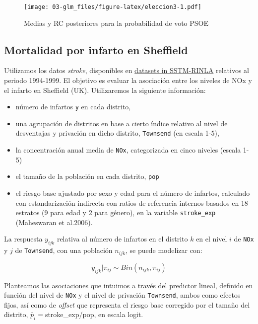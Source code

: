 \documentclass[
]{book}
\providecommand{\tightlist}{%
  \setlength{\itemsep}{0pt}\setlength{\parskip}{0pt}}
\begin{document}
\begin{figure}
\centering
\texttt{[image: 03-glm\_files/figure-latex/eleccion3-1.pdf]}
\caption{\label{fig:eleccion3}Medias y RC posteriores para la probabilidad de voto PSOE}
\end{figure}

\hypertarget{mortalidad-por-infarto-en-sheffield}{%
\subsection{Mortalidad por infarto en Sheffield}\label{mortalidad-por-infarto-en-sheffield}}

Utilizamos los datos \emph{stroke}, disponibles en \href{https://sites.google.com/a/r-inla.org/stbook/datasets}{datasets in
SSTM-RINLA} relativos al periodo 1994-1999. El objetivo es evaluar la asociación entre los niveles de
NOx y el infarto en Sheffield (UK). Utilizaremos la siguiente información:

\begin{itemize}
\tightlist
\item
  número de infartos \texttt{y} en cada distrito,
\item
  una agrupación de distritos en base a cierto índice relativo al nivel de desventajas y privación en dicho distrito, \texttt{Townsend} (en escala 1-5),
\item
  la concentración anual media de \texttt{NOx}, categorizada en cinco niveles (escala 1-5)
\item
  el tamaño de la población en cada distrito, \texttt{pop}
\item
  el riesgo base ajustado por sexo y edad para el número de infartos, calculado con estandarización indirecta con ratios de referencia internos basados en 18 estratos (9 para edad y 2 para género), en la variable \texttt{stroke\_exp} (Maheswaran et al.2006).
\end{itemize}

La respuesta \(y_{ijk}\) relativa al número de infartos en el distrito \(k\) en el nivel \(i\) de \texttt{NOx} y \(j\) de \texttt{Townsend}, con una población \(n_{ijk}\), se puede modelizar con:

\[y_{ijk}|\pi_{ij} \sim Bin(n_{ijk}, \pi_{ij})\]

Planteamos las asociaciones que intuimos a través del predictor lineal, definido en función del nivel de \texttt{NOx} y el nivel de privación \texttt{Townsend}, ambos como efectos fijos, así como de \emph{offset} que representa el riesgo base corregido por el tamaño del distrito, \(\tilde{p_i}=\)stroke\_exp/pop, en escala logit.
\end{document}
